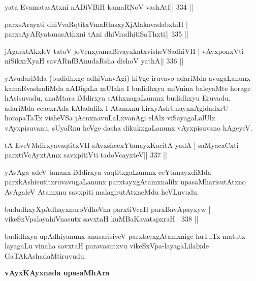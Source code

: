 
\begin{shl}
yata EvamatasAtxni nADiVBiH kamaRNoV vashAtf\hfill || 334 ||
\end{shl}

\begin{shl}
parxsArayati dhiVvaRqtitxVmaRtasxyXjAlakavadabxhiH |
parxsAyAR\s\s yatanasAthxni tAni dhiVradhitiSaThxti\hfill || 335 ||
\end{shl}

\begin{shl}
jAgarxtAkxleV tatoV joVcnx\s yamaBivayxkatxvisheVSadhiVH |
vAyxponxVti niSikxrXyaH savARnfBAnudaRsha dishoV yathA\hfill || 336 ||
\end{shl}

\begin{artha}
yAvudariMda (budidhxge adhiVnavAgi) hiVge iruvavo adariMda avugaLanunx 
kamaRvashadiMda nADigaLa mUlaka I budidhxyu miVnina baleyaMte horage 
hAsisuvadu, anaMtara iMdirxya sAthxnagaLanunx budidhxyu Eruvadu. 
adariMda ecacxrAda kAladalilx I Atamxnu kirxyAshUnayxnAgidadxrU 
horapaTaTx visheVSa jAcnxnavuLaLxvanAgi elAlx viSayagaLalUlx 
vAyxpisuvanu, sUyaRnu heVge dasha dikukxgaLanunx vAyxpisuvano hAgeyeV.
\end{artha}

\begin{shl}
tA EveVMdirxyavaqtitxVH sAvxshecxYtanayxKacitA yadA |
saMyacaCxti parxtiVcAyxtAmx savxpitiVti tadoVcayxteV\hfill || 337 ||
\end{shl}

\begin{artha}
yAvAga adeV tananx iMdirxya vaqtitxgaLanunx ceYtanayxdiMda  parxkAshisutitxruvavugaLanunx parxtayxgAtamxnalilx upasaMharisutAtxno AvAgaleV Atamxnu savxpiti malagirutAtxneMdu heVLuvudu.
\end{artha}

\begin{shl}
bududhxyXpAdhayxnuroVdheVna parxtiVcaH parxBavApayxyw |
vikeSxVpalayahiVnasutx savxtaH kuMBaKavatapxraH\hfill || 338 ||
\end{shl}

\begin{artha}
budidhxya upAdhiyanunx anusarisiyeV parxtayxgAtamxnige huTuTx matutx  layagaLu vinaha savxtaH paravasutxvu vikeSxVpa-layagaLilalxde GaTAkAshadaMtiruvudu.
\end{artha}

\begin{center}
{\bf vAyxKAyxnada upasaMhAra}
\end{center}

